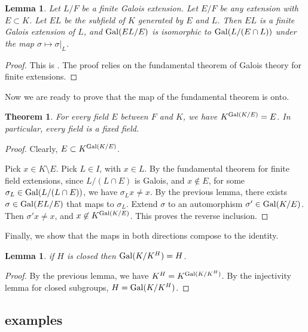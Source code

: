 \documentclass{amsart}
\newtheorem{theorem}[equation]{Theorem}
\newtheorem{lemma}[equation]{Lemma}
\def\oG{\op{Gal}}
\begin{document}
\begin{lemma}
Let $L/F$ be a finite Galois extension.  Let $E/F$ be any extension with $E\subset K$.
Let $EL$ be the subfield of $K$ generated by $E$ and $L$.  Then
$EL$ is a finite Galois extension of $L$, and 
$\oG(EL/E)$ is isomorphic to $\oG(L/(E\cap L))$ under the map 
$\sigma\mapsto\sigma|_L$.
\end{lemma}

\begin{proof} This is \cite[14.4~Prop.~19]{DF}. The proof relies on the fundamental
theorem of Galois theory for finite extensions.
\end{proof}


Now we are ready to prove that the map of the fundamental theorem is onto.

\begin{theorem}
For every field $E$ between $F$ and $K$, we have $K^{\oG(K/E)}  = E$.
In particular, every field is a fixed field.
\end{theorem}

\begin{proof} 
Clearly, $E\subset K^{\oG(K/E)}$.

Pick $x\in K\setminus E$.  Pick $L\in I$, with $x\in L$.
  By the fundamental theorem for finite field extensions, since
  $L/(L\cap E)$ is Galois, and $x\not\in E$, for some $\sigma_L\in
  \oG(L/(L\cap E))$, we have $\sigma_L x \ne x$.
By the previous lemma, there exists $\sigma\in \oG(EL/E)$ that maps
to $\sigma_L$.  Extend $\sigma$ to an automorphism $\sigma'\in\oG(K/E)$.
Then $\sigma'x \ne x$, and $x\not\in K^{\oG(K/E)}$.  
This proves the reverse inclusion.
\end{proof}

Finally, we show that the maps in both directions compose to the identity.

\begin{lemma} if $H$ is closed then $\oG(K/K^H) = H$.
\end{lemma}

\begin{proof}
By the previous lemma,
we have $K^H = K^{\oG(K/K^H)}$.  By the injectivity lemma for closed subgroups,
$H = \oG(K/K^H)$.
\end{proof}



\subsection{examples}
\end{document}
